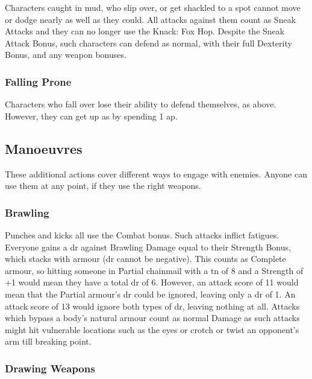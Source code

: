 \begin{multicols}{2}
Characters caught in mud, who slip over, or get shackled to a spot cannot move or dodge nearly as well as they could.
All attacks against them count as Sneak Attacks and they can no longer use the Knack: Fox Hop.
Despite the Sneak Attack Bonus, such characters can defend as normal, with their full Dexterity Bonus, and any weapon bonuses.

\subsubsection[Falling Prone: Same as `Trapped', but characters can spend a movement action to get up]{Falling Prone}
\label{prone}

Characters who fall over lose their ability to defend themselves, as above.
However, they can get up as by spending 1 \gls{ap}.

\subsection{Manoeuvres}

These additional actions cover different ways to engage with enemies.
Anyone can use them at any point, if they use the right weapons.

\subsubsection[Brawling: Make a normal attack roll, but any attack with a Margin less than 5 only inflicts \glspl{fatigue} rather than Damage]{Brawling}

Punches and kicks all use the Combat bonus.
Such attacks inflict \glspl{fatigue}.
Everyone gains a \gls{dr} against Brawling Damage equal to their Strength Bonus, which stacks with armour (\gls{dr} cannot be negative).
This counts as Complete armour, so hitting someone in Partial chainmail with a \gls{tn} of 8 and a Strength of +1 would mean they have a total \gls{dr} of 6.
However, an attack score of 11 would mean that the Partial armour's \gls{dr} could be ignored, leaving only a \gls{dr} of 1.
An attack score of 13 would ignore both types of \gls{dr}, leaving nothing at all.
Attacks which bypass a body's natural armour count as normal Damage as such attacks might hit vulnerable locations such as the eyes or crotch or twist an opponent's arm till breaking point.

\subsubsection[Drawing Weapon -- Cost: 1 \glsentrytext{ap}]{Drawing Weapons}


\end{multicols}
